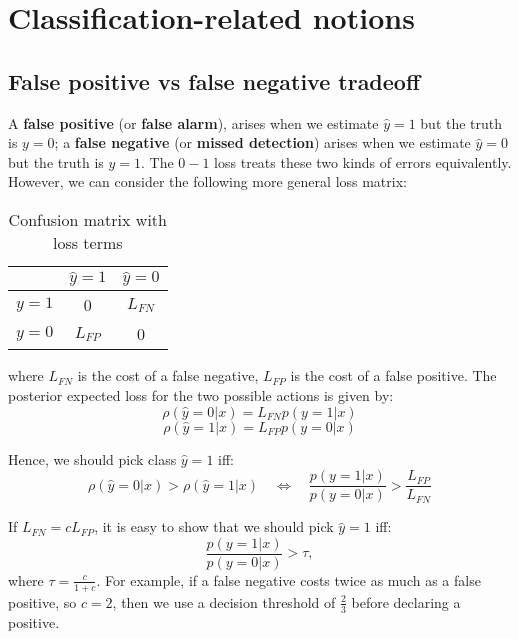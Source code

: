 \documentclass[12pt, a4paper]{article}
\theoremstyle{definition}
\numberwithin{figure}{section}
\numberwithin{equation}{section}
\numberwithin{table}{section}
\begin{document}
\section{Classification-related notions}
\subsection{False positive vs false negative tradeoff}
A \textbf{false positive} (or \textbf{false alarm}), arises when we estimate $\hat{y} = 1$ but the truth is $y = 0$; a \textbf{false negative} (or \textbf{missed detection}) arises when we estimate $\hat{y} = 0$ but the truth is $y = 1$. The $0-1$ loss treats these two kinds of errors equivalently. However, we can consider the following more general loss matrix:

\begin{table}[h]
    \centering
    \begin{tabular}{c|cc}
        & $\hat{y} = 1$ & $\hat{y} = 0$ \\
        \hline
        $y = 1$ & 0 & $L_{FN}$ \\
        $y = 0$ & $L_{FP}$ & 0 \\
    \end{tabular}
    \caption{Confusion matrix with loss terms}
    \label{tab:confusion-matrix}
\end{table}

where $L_{FN}$ is the cost of a false negative, $L_{FP}$ is the cost of a false positive. The posterior expected loss for the two possible actions is given by:
\begin{equation}
    \rho(\hat{y} = 0 | x) = L_{FN} p(y = 1 | x)
\end{equation}
\begin{equation}
    \rho(\hat{y} = 1 | x) = L_{FP} p(y = 0 | x)
\end{equation}

Hence, we should pick class $\hat{y} = 1$ iff:
\begin{equation}
    \rho(\hat{y} = 0 | x) > \rho(\hat{y} = 1 | x) 
    \quad \Leftrightarrow \quad
    \frac{p(y = 1 | x)}{p(y = 0 | x)} > \frac{L_{FP}}{L_{FN}}
\end{equation}

If $L_{FN} = c L_{FP}$, it is easy to show that we should pick $\hat{y} = 1$ iff:
\begin{equation}
    \frac{p(y = 1 | x)}{p(y = 0 | x)} > \tau,
\end{equation}
where $\tau = \frac{c}{1 + c}$. For example, if a false negative costs twice as much as a false positive, so $c = 2$, then we use a decision threshold of $\frac{2}{3}$ before declaring a positive.
\end{document}
